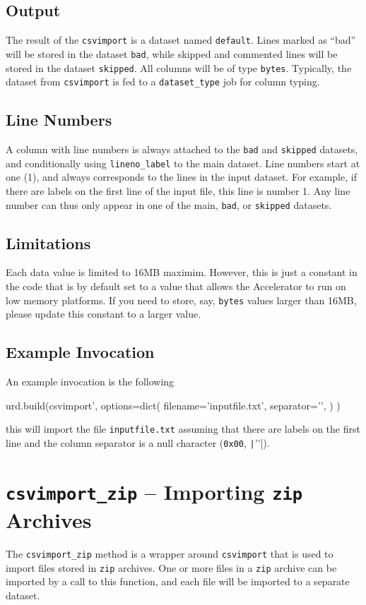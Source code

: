 \subsection{Output}
The result of the \texttt{csvimport} is a dataset named
\texttt{default}.  Lines marked as ``bad'' will be stored in the
dataset \texttt{bad}, while skipped and commented lines will be stored
in the dataset \texttt{skipped}.  All columns will be of type
\texttt{bytes}.  Typically, the dataset from
\texttt{csvimport} is fed to a \texttt{dataset\_type} job for column
typing.


\subsection{Line Numbers}
A column with line numbers is always attached to the \texttt{bad}
and \texttt{skipped} datasets, and conditionally
using \texttt{lineno\_label} to the main dataset.  Line numbers start
at one (1), and always corresponds to the lines in the input dataset.
For example, if there are labels on the first line of the input file,
this line is number 1.  Any line number can thus only appear in one of
the main, \texttt{bad}, or \texttt{skipped} datasets.


\subsection{Limitations}
Each data value is limited to 16MB maximim.  However, this is just a
constant in the code that is by default set to a value that allows the
Accelerator to run on low memory platforms.  If you need to store,
say, \texttt{bytes} values larger than 16MB, please update this
constant to a larger value.


\subsection{Example Invocation}
An example invocation is the following

\begin{python}
urd.build(csvimport',
    options=dict(
        filename='inputfile.txt',
        separator='\0',
    )
)
\end{python}
this will import the file \texttt{inputfile.txt} assuming that there
are labels on the first line and the column separator is a null
character (\texttt{0x00}, \texttt|'\0'|).



\clearpage
\section{\texttt{csvimport\_zip} -- Importing \texttt{zip} Archives}
The \texttt{csvimport\_zip} method is a wrapper
around \texttt{csvimport} that is used to import files stored in
\texttt{zip} archives.  One or more files in a \texttt{zip} archive
can be imported by a call to this function, and each file will be
imported to a separate dataset.


